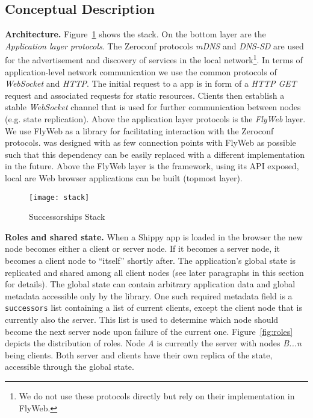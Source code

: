 \subsection{Conceptual Description}
\label{sub:approach_conceptual_description}

\textbf{Architecture.} 
Figure~\ref{fig:stack} shows the \APIName stack.
On the bottom layer are the \textit{Application layer protocols}.
The Zeroconf protocols \textit{mDNS} and \textit{DNS-SD} are used for the advertisement and discovery of \APIshort services in the local network\footnote{We do not use these protocols directly but rely on their implementation in FlyWeb.}. 
In terms of application-level network communication we use the common protocols of \textit{WebSocket} and \textit{HTTP}. 
The initial request to a \APIshort app is in form of a \textit{HTTP GET} request and associated requests for static resources.  Clients then establish a stable \textit{WebSocket} channel that is used for further communication between nodes (e.g. state replication). 
Above the application layer protocols is the \textit{FlyWeb} layer. 
We use FlyWeb as a library for facilitating interaction with the Zeroconf protocols. 
\APIName was designed with as few connection points with FlyWeb as possible such that this dependency can be easily replaced with a different implementation in the future. 
Above the FlyWeb layer is the \textit{\APIName} framework, using its API exposed, local are Web browser applications can be built (topmost layer).

\begin{figure}[h]
    \centering
    \texttt{[image: stack]}
    \caption{Successorships Stack}
    \label{fig:stack}
\end{figure}

\noindent\textbf{Roles and shared state.} When a Shippy app is loaded in the browser the new node becomes either a client or server node. 
If it becomes a server node, it becomes a client node to ``itself'' shortly after. 
The application's global state is replicated and shared among all client nodes (see later paragraphs in this section for details). 
The global state can contain arbitrary application data and global metadata accessible only by the \APIshort library. 
One such required metadata field is a \texttt{successors} list containing a list of current clients, except the client node that is currently also the server. 
This list is used to determine which node should become the next server node upon failure of the current one. 
Figure~\ref{fig:roles} depicts the distribution of roles. Node \textit{A} is currently the server with nodes \textit{B...n} being clients. 
Both server and clients have their own replica of the state, accessible through the global state.

